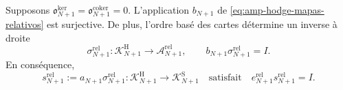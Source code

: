 \begin{lemma}
\label{lem:amp-hodge-sobreyectividad-relativa}
Supposons
\(\mathfrak o_{N+1}^{\ker}
=\mathfrak o_{N+1}^{\mathrm{coker}}=0\).
L'application \(b_{N+1}\) de
\eqref{eq:amp-hodge-mapas-relativos} est surjective. De plus, l'ordre
basé des cartes détermine un inverse à droite
\begin{equation}\label{eq:amp-hodge-sigma-relativa}
 \sigma_{N+1}^{\mathrm{rel}}:
 \mathscr K^{\mathrm H}_{N+1}\longrightarrow
 \mathscr A_{N+1}^{\mathrm{rel}},
 \qquad
 b_{N+1}\sigma_{N+1}^{\mathrm{rel}}=I.
\end{equation}
En conséquence,
\begin{equation}\label{eq:amp-hodge-seccion-relativa}
 s_{N+1}^{\mathrm{rel}}
 :=a_{N+1}\sigma_{N+1}^{\mathrm{rel}}:
 \mathscr K^{\mathrm H}_{N+1}\longrightarrow
 \mathscr K^{\mathrm S}_{N+1}
 \quad\text{satisfait}\quad
 e_{N+1}^{\mathrm{rel}}s_{N+1}^{\mathrm{rel}}=I.
\end{equation}
\end{lemma}

